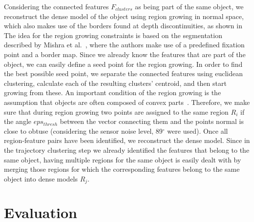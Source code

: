 Considering the connected features $F_{clusters}$ as being part of the same object, we reconstruct 
the dense model of the object using region growing in normal space, which also makes use of the 
borders found at depth discontinuities, as shown in %
The idea for the region growing 
constraints is based on the segmentation described by Mishra et al.~\cite{asICCV2009}, 
where the authors make use of a predefined fixation point and a border map. Since we already 
know the features that are part of the object, we can easily define a seed point for the
region growing. In order to find the best possible seed point, we separate the connected 
features using euclidean clustering, calculate each of the resulting clusters' centroid, and 
then start growing from these. An important condition of the region growing is the 
assumption that objects are often composed of convex parts~\cite{Pogor}.
Therefore, we make sure that during region growing two points are assigned to the same region $R_{i}$
if the angle $eps_{thresh}$ between the vector connecting them and the points normal is close to obtuse
(considering the sensor noise level\cite{kinect_accuracy}, 89$^\circ$ were used).
Once all region-feature pairs have been identified, we reconstruct the dense model.
Since in the trajectory clustering step we already identified the features that belong to the same object,
having multiple regions for the same object is easily dealt with
by merging those regions for which the corresponding features belong to the same object into dense models $R_{j}$.



\section{Evaluation}
\label{sec:evaluation}
